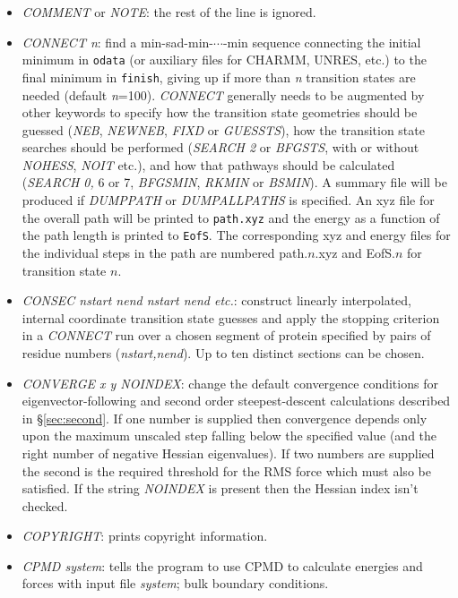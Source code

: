 \documentclass[12pt,a4paper,dvips]{article}
\begin{document}
\begin{itemize}
\item {\it COMMENT\/} or {\it NOTE\/}: the rest of the line is ignored.

\item {\it CONNECT n\/}: find a min-sad-min-$\cdots$-min sequence connecting
the initial minimum in {\tt odata}  
(or auxiliary files for CHARMM, UNRES, etc.) to the final minimum in {\tt finish},
giving up if more than {\it n\/} transition states are needed (default {\it n\/}=100). {\it CONNECT\/}
generally needs to be augmented by other keywords to specify how the transition
state geometries should be guessed ({\it NEB\/}, {\it NEWNEB\/}, {\it FIXD\/}
or {\it GUESSTS\/}), how the transition
state searches should be performed ({\it SEARCH 2\/} or {\it BFGSTS\/}, with or
without {\it NOHESS\/}, {\it NOIT\/} etc.), and how that pathways should be
calculated ({\it SEARCH 0,\/} 6 or 7, {\it BFGSMIN\/}, {\it RKMIN} or {\it BSMIN\/}).
A summary file will be produced if {\it DUMPPATH\/} or {\it DUMPALLPATHS\/} is specified. An xyz file
for the overall path will be printed to {\tt path.xyz} and the energy as a
function of the path length is printed to {\tt EofS}. The corresponding xyz and energy
files for the individual steps in the path are numbered path.$n$.xyz and EofS.$n$ for
transition state $n$.

\item {\it CONSEC nstart nend nstart nend etc.\/}: construct linearly interpolated, internal coordinate
transition state guesses and apply the stopping criterion in a {\it CONNECT\/} run over a chosen
segment of protein specified by pairs of residue numbers
({\it nstart,nend\/}).  Up to ten distinct sections can be chosen.

\item {\it CONVERGE x y NOINDEX\/}: change the default convergence conditions
for eigenvector-following and second order steepest-descent calculations 
described in \S\ref{sec:second}. If one number is supplied then convergence depends only upon
the maximum unscaled step falling below the specified value (and the right number
of negative Hessian eigenvalues). If two numbers are supplied the second is the 
required threshold for the RMS force which must also be satisfied.
If the string {\it NOINDEX\/} is present then the Hessian index isn't checked.

\item {\it COPYRIGHT\/}: prints copyright information.

\item {\it CPMD system\/}: tells the program to use CPMD to calculate energies and
forces with input file {\it system\/}; bulk boundary conditions.


\end{itemize}
\end{document}
